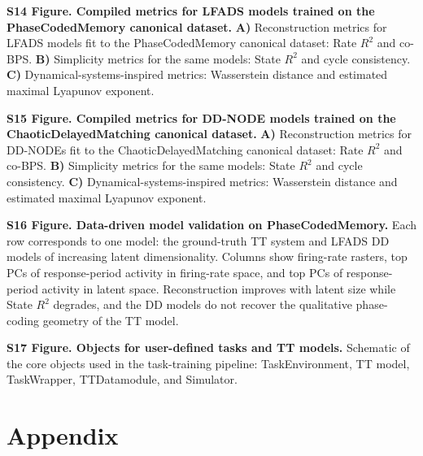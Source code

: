 \documentclass{article}
\renewcommand{\thefigure}{S\arabic{figure}}%
\renewcommand{\thetable}{S\arabic{table}}%
\begin{document}
\noindent\textbf{S14 Figure. Compiled metrics for LFADS models trained on the PhaseCodedMemory canonical dataset.}
\textbf{A)} Reconstruction metrics for LFADS models fit to the PhaseCodedMemory canonical dataset: Rate $R^2$ and co-BPS. \textbf{B)} Simplicity metrics for the same models: State $R^2$ and cycle consistency. \textbf{C)} Dynamical-systems-inspired metrics: Wasserstein distance and estimated maximal Lyapunov exponent.

\noindent\textbf{S15 Figure. Compiled metrics for DD-NODE models trained on the ChaoticDelayedMatching canonical dataset.}
\textbf{A)} Reconstruction metrics for DD-NODEs fit to the ChaoticDelayedMatching canonical dataset: Rate $R^2$ and co-BPS. \textbf{B)} Simplicity metrics for the same models: State $R^2$ and cycle consistency. \textbf{C)} Dynamical-systems-inspired metrics: Wasserstein distance and estimated maximal Lyapunov exponent.

\noindent\textbf{S16 Figure. Data-driven model validation on PhaseCodedMemory.}
Each row corresponds to one model: the ground-truth TT system and LFADS DD models of increasing latent dimensionality. Columns show firing-rate rasters, top PCs of response-period activity in firing-rate space, and top PCs of response-period activity in latent space. Reconstruction improves with latent size while State $R^2$ degrades, and the DD models do not recover the qualitative phase-coding geometry of the TT model.

\noindent\textbf{S17 Figure. Objects for user-defined tasks and TT models.}
Schematic of the core objects used in the task-training pipeline: TaskEnvironment, TT model, TaskWrapper, TTDatamodule, and Simulator.

\newpage


\newpage

\appendix
\renewcommand{\thefigure}{S\arabic{figure}}
\setcounter{figure}{0}
\renewcommand{\thetable}{S\arabic{table}}
\setcounter{table}{0}
\section*{Appendix}
\end{document}
